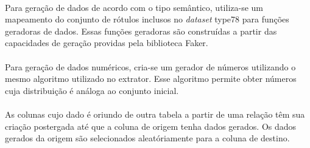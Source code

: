\paragraph{} Para geração de dados de acordo com o tipo semântico, utiliza-se um mapeamento do conjunto de rótulos inclusos no \textit{dataset} type78 para funções geradoras de dados. Essas funções geradoras são construídas a partir das capacidades de geração providas pela biblioteca Faker.

\paragraph{} Para geração de dados numéricos, cria-se um gerador de números utilizando o mesmo algoritmo utilizado no extrator. Esse algoritmo permite obter números cuja distribuição é análoga ao conjunto inicial.

\paragraph{} As colunas cujo dado é oriundo de outra tabela a partir de uma relação têm sua criação postergada até que a coluna de origem tenha dados gerados. Os dados gerados da origem são selecionados aleatóriamente para a coluna de destino.